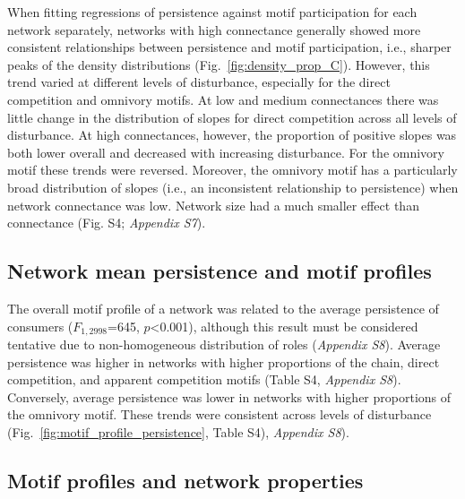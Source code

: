 \documentclass[12pt]{article}
\begin{document}
\begin{spacing}{2.0}
            When fitting regressions of persistence against motif participation for each network separately, networks with high connectance generally showed more consistent relationships between persistence and motif participation, i.e., sharper peaks of the density distributions (Fig.~\ref{fig:density_prop_C}).
            However, this trend varied at different levels of disturbance, especially for the direct competition and omnivory motifs.
            At low and medium connectances there was little change in the distribution of slopes for direct competition across all levels of disturbance. 
            At high connectances, however, the proportion of positive slopes was both lower overall and decreased with increasing disturbance. 
            For the omnivory motif these trends were reversed. 
            Moreover, the omnivory motif has a particularly broad distribution of slopes (i.e., an inconsistent relationship to persistence) when network connectance was low. 
            Network size had a much smaller effect than connectance (Fig. S4; \emph{Appendix S7}).


    \subsection*{Network mean persistence and motif profiles}
        The overall motif profile of a network was related to the average persistence of consumers ($F_{1,2998}$=645, $p$\textless0.001), although this result must be considered tentative due to non-homogeneous distribution of roles (\emph{Appendix S8}). 
        Average persistence was higher in networks with higher proportions of the chain, direct competition, and apparent competition motifs (Table S4, \emph{Appendix S8}). 
        Conversely, average persistence was lower in networks with higher proportions of the omnivory motif. 
        These trends were consistent across levels of disturbance (Fig.~\ref{fig:motif_profile_persistence}, Table S4), \emph{Appendix S8}).%


    \subsection*{Motif profiles and network properties}


\end{spacing}
\end{document}
